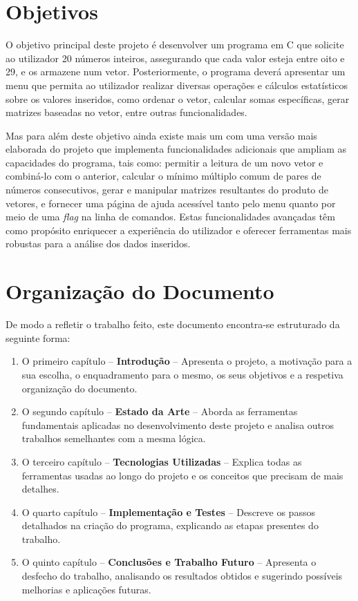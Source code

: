 \section{Objetivos}
\label{sec:obj}
O objetivo principal deste projeto é desenvolver um programa em C que solicite ao utilizador 20 números inteiros, assegurando que cada valor esteja entre oito e 29, e os armazene num vetor. Posteriormente, o programa deverá apresentar um menu que permita ao utilizador realizar diversas operações e cálculos estatísticos sobre os valores inseridos, como ordenar o vetor, calcular somas específicas, gerar matrizes baseadas no vetor, entre outras funcionalidades. \par
Mas para além deste objetivo ainda existe mais um com uma versão mais elaborada do projeto que implementa funcionalidades adicionais que ampliam as capacidades do programa, tais como: permitir a leitura de um novo vetor e combiná-lo com o anterior, calcular o mínimo múltiplo comum de pares de números consecutivos, gerar e manipular matrizes resultantes do produto de vetores, e fornecer uma página de ajuda acessível tanto pelo menu quanto por meio de uma \textit{flag} na linha de comandos. Estas funcionalidades avançadas têm como propósito enriquecer a experiência do utilizador e oferecer ferramentas mais robustas para a análise dos dados inseridos.


\section{Organização do Documento}
\label{sec:organ}
De modo a refletir o trabalho feito, este documento encontra-se estruturado da seguinte forma:
\begin{enumerate}
\item O primeiro capítulo -- \textbf{Introdução} -- Apresenta o projeto, a motivação para a sua escolha, o enquadramento para o mesmo, os seus objetivos e a respetiva organização do documento.
\item O segundo capítulo -- \textbf{Estado da Arte} -- Aborda as ferramentas fundamentais aplicadas no desenvolvimento deste projeto e analisa outros trabalhos semelhantes com a mesma lógica.
\item O terceiro capítulo -- \textbf{Tecnologias Utilizadas} -- Explica todas as ferramentas usadas ao longo do projeto e os conceitos que precisam de mais detalhes.
\item O quarto capítulo -- \textbf{Implementação e Testes} -- Descreve os passos detalhados na criação do programa, explicando as etapas presentes do trabalho.
\item O quinto capítulo -- \textbf{Conclusões e Trabalho Futuro} -- Apresenta o desfecho do trabalho, analisando os resultados obtidos e sugerindo possíveis melhorias e aplicações futuras.
\end{enumerate}

